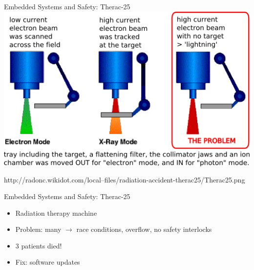 \documentclass[aspectratio=169]{beamer}
\begin{document}
\begin{frame}{Embedded Systems and Safety: Therac-25}
\centering
\includegraphics[width=0.65\linewidth,keepaspectratio]{img/Therac25.png}
\vspace{0.25em}
\begin{footnotesize}http://radonc.wikidot.com/local--files/radiation-accident-therac25/Therac25.png\end{footnotesize}
\end{frame} 



\begin{frame}{Embedded Systems and Safety: Therac-25}
  \begin{itemize}
  \item Radiation therapy machine
  \item Problem: \alert{many} $\rightarrow$ race conditions, overflow,
    no safety interlocks
  \item 3 patients died!
  \item Fix: software updates
  \end{itemize}



\end{frame}
\end{document}
